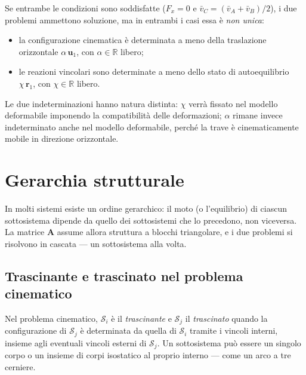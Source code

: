 \begin{esempio}
\begin{svolgimento}
		Se entrambe le condizioni sono soddisfatte
		($F_x = 0$ e $\bar{v}_C = (\bar{v}_A+\bar{v}_B)/2$),
		i due problemi ammettono soluzione, ma in entrambi
		i casi essa è \emph{non unica}:
		\begin{itemize}[noitemsep]
			\item la configurazione cinematica è determinata
			a meno della traslazione orizzontale $\alpha\,\bm{u}_1$,
			con $\alpha \in \mathbb{R}$ libero;
			\item le reazioni vincolari sono determinate a
			meno dello stato di autoequilibrio $\chi\,\bm{r}_1$,
			con $\chi \in \mathbb{R}$ libero.
		\end{itemize}
		Le due indeterminazioni hanno natura distinta:
		$\chi$ verrà fissato nel modello deformabile imponendo
		la compatibilità delle deformazioni; $\alpha$
		rimane invece indeterminato anche nel modello
		deformabile, perché la trave è cinematicamente
		mobile in direzione orizzontale.
		
	\end{svolgimento}
\end{esempio}


\section{Gerarchia strutturale}
\label{sec:gerarchia}

In molti sistemi esiste un ordine gerarchico: il moto
(o l'equilibrio) di ciascun sottosistema dipende da quello dei
sottosistemi che lo precedono, non viceversa. La matrice $\bm{A}$
assume allora struttura a blocchi triangolare, e i due problemi si
risolvono in cascata --- un sottosistema alla volta.

\subsection{Trascinante e trascinato nel problema cinematico}
\label{sec:trascinante}

Nel problema cinematico, $\mathcal{S}_i$ è il
\emph{trascinante} e $\mathcal{S}_j$ il
\emph{trascinato} quando la configurazione di
$\mathcal{S}_j$ è determinata da quella di $\mathcal{S}_i$
tramite i vincoli interni, insieme agli eventuali vincoli
esterni di $\mathcal{S}_j$. Un sottosistema può essere un
singolo corpo o un insieme di corpi isostatico al proprio
interno --- come un arco a tre cerniere.

